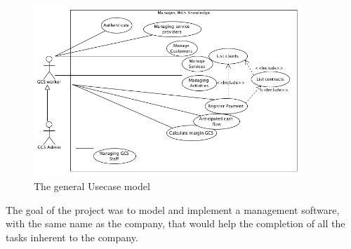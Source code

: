 \begin{figure}[!htbp]
\begin{center}
\includegraphics[width=0.9\textwidth]{images/usecase.png}
\caption{The general Usecase model}\label{fig:usecase}
\end{center}
\end{figure} 

The goal of the project was to model and implement a management software, with the same name as the company, that would help the completion of all the tasks inherent to the company.
